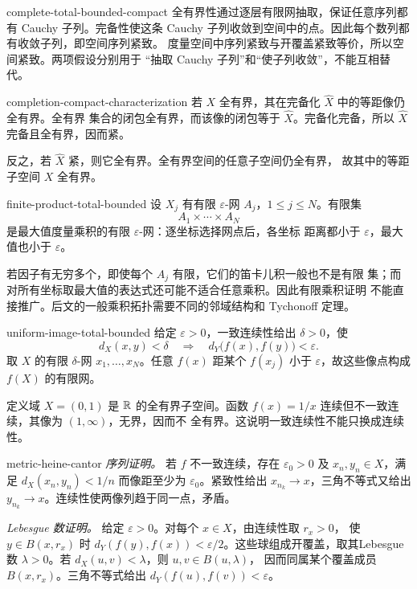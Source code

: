 \begin{solution}{complete-total-bounded-compact}
全有界性通过逐层有限网抽取，保证任意序列都有 Cauchy 子列。完备性使这条
Cauchy 子列收敛到空间中的点。因此每个数列都有收敛子列，即空间序列紧致。
度量空间中序列紧致与开覆盖紧致等价，所以空间紧致。两项假设分别用于
“抽取 Cauchy 子列”和“使子列收敛”，不能互相替代。
\end{solution}

\begin{solution}{completion-compact-characterization}
若 \(X\) 全有界，其在完备化 \(\widehat X\) 中的等距像仍全有界。全有界
集合的闭包全有界，而该像的闭包等于 \(\widehat X\)。完备化完备，所以
\(\widehat X\) 完备且全有界，因而紧。

反之，若 \(\widehat X\) 紧，则它全有界。全有界空间的任意子空间仍全有界，
故其中的等距子空间 \(X\) 全有界。
\end{solution}

\begin{solution}{finite-product-total-bounded}
设 \(X_j\) 有有限 \(\varepsilon\)-网 \(A_j\)，\(1\le j\le N\)。有限集
\[
 A_1\times\cdots\times A_N
\]
是最大值度量乘积的有限 \(\varepsilon\)-网：逐坐标选择网点后，各坐标
距离都小于 \(\varepsilon\)，最大值也小于 \(\varepsilon\)。

若因子有无穷多个，即使每个 \(A_j\) 有限，它们的笛卡儿积一般也不是有限
集；而对所有坐标取最大值的表达式还可能不适合任意乘积。因此有限乘积证明
不能直接推广。后文的一般乘积拓扑需要不同的邻域结构和 Tychonoff 定理。
\end{solution}

\begin{solution}{uniform-image-total-bounded}
给定 \(\varepsilon>0\)，一致连续性给出 \(\delta>0\)，使
\[
 d_X(x,y)<\delta
 \quad\Longrightarrow\quad
 d_Y\bigl(f(x),f(y)\bigr)<\varepsilon.
\]
取 \(X\) 的有限 \(\delta\)-网 \(x_1,\ldots,x_N\)。任意 \(f(x)\)
距某个 \(f(x_j)\) 小于 \(\varepsilon\)，故这些像点构成 \(f(X)\)
的有限网。

定义域 \(X=(0,1)\) 是 \(\mathbb{R}\) 的全有界子空间。函数
\(f(x)=1/x\) 连续但不一致连续，其像为 \((1,\infty)\)，无界，因而不
全有界。这说明一致连续性不能只换成连续性。
\end{solution}

\begin{solution}{metric-heine-cantor}
\textit{序列证明。}
若 \(f\) 不一致连续，存在 \(\varepsilon_0>0\) 及
\(x_n,y_n\in X\)，满足 \(d_X(x_n,y_n)<1/n\) 而像距至少为
\(\varepsilon_0\)。紧致性给出 \(x_{n_k}\to x\)，三角不等式又给出
\(y_{n_k}\to x\)。连续性使两像列趋于同一点，矛盾。

\textit{Lebesgue 数证明。}
给定 \(\varepsilon>0\)。对每个 \(x\in X\)，由连续性取 \(r_x>0\)，
使 \(y\in B(x,r_x)\) 时
\(d_Y(f(y),f(x))<\varepsilon/2\)。这些球组成开覆盖，取其Lebesgue数
\(\lambda>0\)。若 \(d_X(u,v)<\lambda\)，则 \(u,v\in B(u,\lambda)\)，
因而同属某个覆盖成员 \(B(x,r_x)\)。三角不等式给出
\(d_Y(f(u),f(v))<\varepsilon\)。
\end{solution}

